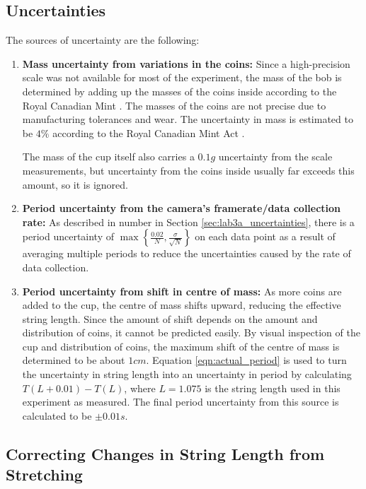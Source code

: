 \documentclass[aps,twocolumn,secnumarabic,nobalancelastpage,amsmath,amssymb,nofootinbib,floatfix,letterpaper]{revtex4}
\begin{document}
\subsection{Uncertainties}
\label{sec:lab3b_uncertainties}

The sources of uncertainty are the following:
\begin{enumerate}
    \item
        \textbf{Mass uncertainty from variations in the coins:} Since a high-precision scale was not available for most
        of the experiment, the mass of the bob is determined by adding up the masses of the coins inside according to
        the Royal Canadian Mint \cite{mint}. The masses of the coins are not precise due to manufacturing tolerances and
        wear. The uncertainty in mass is estimated to be \(4\%\) according to the Royal Canadian Mint Act \cite{mint_act}.
        
        The mass of the cup itself also carries a \(0.1\si{g}\) uncertainty from the scale measurements, but uncertainty
        from the coins inside usually far exceeds this amount, so it is ignored.
    \item
        \textbf{Period uncertainty from the camera's framerate/data collection rate:} As described in number 
        in Section \ref{sec:lab3a_uncertainties}, there is a period uncertainty of
        \(\max\left\{\frac{0.02}{N}, \frac{\sigma}{\sqrt{N}}\right\}\) on each data point as a result of averaging
        multiple periods to reduce the uncertainties caused by the rate of data collection.
    \item
        \textbf{Period uncertainty from shift in centre of mass:} As more coins are added to the cup, the centre of mass
        shifts upward, reducing the effective string length. Since the amount of shift depends on the amount and
        distribution of coins, it cannot be predicted easily. By visual inspection of the cup and distribution of coins,
        the maximum shift of the centre of mass is determined to be about \(1\si{cm}\). Equation \ref{eqn:actual_period}
        is used to turn the uncertainty in string length into an uncertainty in period by calculating \(T(L + 0.01) - T(L)\),
        where \(L = 1.075\) is the string length used in this experiment as measured. The final period uncertainty from
        this source is calculated to be \(\pm 0.01\si{s}\).
\end{enumerate}

\subsection{Correcting Changes in String Length from Stretching}
\label{sec:lab3b_correction}
\end{document}
